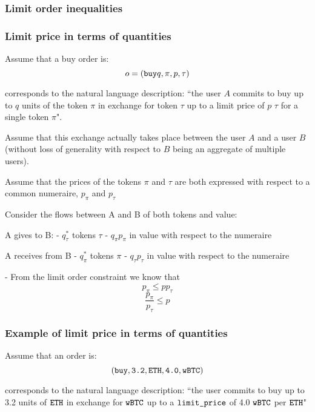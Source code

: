 \documentclass[11pt, reqno]{amsart}
\theoremstyle{definition}
\theoremstyle{remark}
\newcommand{\BTC}{\textnormal{\texttt{wBTC}}}
\newcommand{\ETH}{\textnormal{\texttt{ETH}}}
\newcommand{\limitprice}{\textnormal{\texttt{limit\_price}}}
\newcommand{\buy}{\textnormal{\texttt{buy}}}
\begin{document}
\subsubsection{Limit order inequalities}

%

\subsubsection{Limit price in terms of quantities}
Assume that a buy order is:
\[
	o = (\buy q, \pi, p, \tau)
\]

corresponds to the natural language description:
``the user $A$ commits to buy up to $q$ units of the token $\pi$ in exchange
for token $\tau$ up to a limit price of $p$ $\tau$ for a single token
$\pi$".

Assume that this exchange actually takes place between the user $A$ and a user
$B$ (without loss of generality with respect to $B$ being an aggregate of
multiple users).

Assume that the prices of the tokens $\pi$ and $\tau$ are both expressed with
respect to a common numeraire, $p_{\pi}$ and $p_{\tau}$

Consider the flows between A and B of both tokens and value:

A gives to B:
- $q^*_{\tau}$ tokens $\tau$
- $q_{\pi} p_{\pi}$ in value with respect to the numeraire

A receives from B
- $q^*_{\pi}$ tokens $\pi$
- $q_{\tau} p_{\tau}$ in value with respect to the numeraire

- From the limit order constraint we know that
  $$p_{\pi} \le p p_{\tau}$$
  $$\frac{p_{\pi}}{p_{\tau}} \le p$$

\subsubsection{Example of limit price in terms of quantities}
Assume that an order is:
\[
  (\buy, \textnormal{\texttt{3.2}}, \ETH, \textnormal{\texttt{4.0}}, \BTC)
\]

corresponds to the natural language description:
``the user commits to buy up to 3.2 units of $\ETH$ in exchange for $\BTC$ up
to a $\limitprice$ of 4.0 $\BTC$ per $\ETH$"
\end{document}
